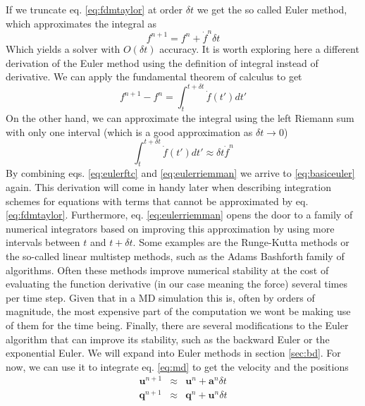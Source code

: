 \documentclass[ twoside,openright,titlepage,numbers=noenddot,%
headinclude,footinclude,cleardoublepage=empty,abstract=on,
BCOR=5mm,paper=a4,fontsize=11pt, dvipsnames
]{scrreprt}
\renewcommand{\vec}[1]{\bm{#1}}
\newcommand{\dt}{\delta t}
\newcommand{\ppos}{q}
\newcommand{\pvel}{u}
\begin{document}
If we truncate eq. \eqref{eq:fdmtaylor} at order $\dt$ we get the so called Euler method\cite{Butcher2016}, which approximates the integral as
\begin{equation}
  \label{eq:basiceuler}
  f^{n+1} = f^n + \dot{f}^n\dt
\end{equation}
Which yields a solver with $O(\dt)$ accuracy\cite{Butcher2016}.
It is worth exploring here a different derivation of the Euler method using the definition of integral instead of derivative. We can apply the fundamental theorem of calculus to get
\begin{equation}
  \label{eq:eulerftc}
  f^{n+1} - f^n = \int_t^{t+\dt}\dot{f}(t')dt'
\end{equation}
On the other hand, we can approximate the integral using the left Riemann sum with only one interval (which is a good approximation as $\dt\rightarrow 0$)
\begin{equation}
  \label{eq:eulerriemman}
  \int_t^{t+\dt}\dot{f}(t')dt' \approx \dt \dot{f}^n
\end{equation}
By combining eqs. \eqref{eq:eulerftc} and \eqref{eq:eulerriemman} we arrive to \eqref{eq:basiceuler} again.
This derivation will come in handy later when describing integration schemes for equations with terms that cannot be approximated by eq. \eqref{eq:fdmtaylor}.
Furthermore, eq. \eqref{eq:eulerriemman} opens the door to a family of numerical integrators based on improving this approximation by using more intervals between $t$ and $t+\dt$. Some examples are the Runge-Kutta methods or the so-called linear multistep methods, such as the Adams Bashforth family of algorithms\cite{Butcher2016}.
Often these methods improve numerical stability at the cost of evaluating the function derivative (in our case meaning the force) several times per time step. Given that in a \gls{MD} simulation this is, often by orders of magnitude, the most expensive part of the computation we wont be making use of them for the time being.
Finally, there are several modifications to the Euler algorithm that can improve its stability, such as the backward Euler\cite{Butcher2016} or the exponential Euler\cite{Butcher2016}.
We will expand into Euler methods in section \ref{sec:bd}.
For now, we can use it to integrate eq. \eqref{eq:md} to get the velocity and the positions
\begin{equation}
  \label{eq:basiceulermd}
  \begin{aligned}
  \vec{\pvel}^{n+1} &\approx& \vec{\pvel}^n + \vec{a}^n\dt\\
  \vec{\ppos}^{n+1} &\approx& \vec{\ppos}^n + \vec{\pvel}^n\dt
\end{aligned}
\end{equation}
\end{document}

